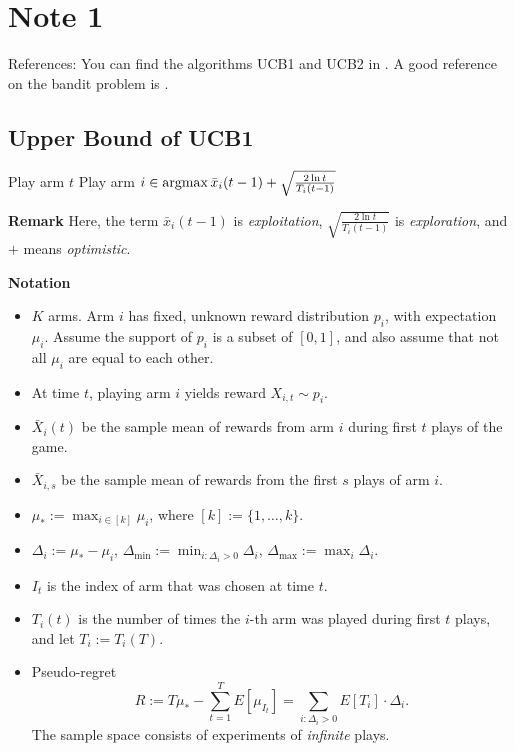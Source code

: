 \section{Note 1}

References: You can find the algorithms UCB1 and UCB2 in \cite{Auer2002}.
A good reference on the bandit problem is \cite{MAL024}.

\subsection{Upper Bound of UCB1} %

\begin{alg}[UCB1] \leavevmode
    \begin{framed}
        \begin{algorithmic}
                \State Play arm $t$
            \EndFor
                \State Play arm $i\in\mathop{\mathrm{argmax}} \bar x_{i}(t-1) + \sqrt{\frac{2\ln t}{T_i(t-1)}}$
            \EndFor
        \end{algorithmic}
    \end{framed}
\end{alg}

\textbf{Remark}
Here,
the term $\bar x_{i}(t-1)$ is \emph{exploitation},
$\sqrt{\frac{2\ln t}{T_i(t-1)}}$ is \emph{exploration},
and $+$ means \emph{optimistic}.

\textbf{Notation}
\begin{itemize}
    \item $K$ arms.
        Arm $i$ has fixed, unknown reward distribution $p_i$,
        with expectation $\mu_i$.
        Assume the support of $p_i$ is a subset of $[0,1]$, and
        also assume that not all $\mu_i$ are equal to each other.
    \item At time $t$, playing arm $i$ yields reward $X_{i,t}\sim p_i$.
    \item $\bar X_{i}(t)$ be the sample mean of rewards from arm $i$ during first $t$ plays of the game.
    \item $\bar X_{i,s}$ be the sample mean of rewards from the first $s$ plays of arm $i$.
    \item $\mu_*:=\max_{i\in[k]}\mu_i$, where $[k]:=\{1,\dots,k\}$.
    \item $\Delta_i:=\mu_* - \mu_i$,
        $\Delta_{\text{min}}:=\min_{i:\Delta_i>0}\Delta_i$,
        $\Delta_{\text{max}}:=\max_i \Delta_i$.
    \item $I_t$ is the index of arm that was chosen at time $t$.
    \item $T_i(t)$ is the number of times the $i$-th arm was played during first $t$ plays,
        and let $T_i:=T_i(T)$.
    \item Pseudo-regret
        \begin{equation}
            R:=T\mu_*-\sum_{t=1}^T E[\mu_{I_t}]
            = \sum_{i:\Delta_i>0} E[T_i]\cdot\Delta_i.
        \end{equation}
        The sample space consists of experiments of \emph{infinite} plays.
\end{itemize}
\

